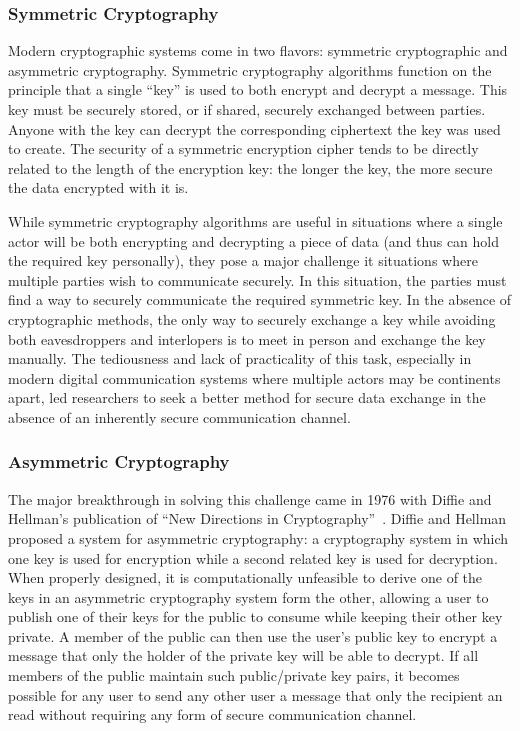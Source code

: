\subsubsection{Symmetric Cryptography}

Modern cryptographic systems come in two flavors: symmetric
cryptographic and asymmetric cryptography. Symmetric cryptography
algorithms function on the principle that a single ``key'' is used to
both encrypt and decrypt a message. This key must be securely stored,
or if shared, securely exchanged between parties. Anyone with the key
can decrypt the corresponding ciphertext the key was used to
create. The security of a symmetric encryption cipher tends to be
directly related to the length of the encryption key: the longer the
key, the more secure the data encrypted with it is.

While symmetric cryptography algorithms are useful in situations where
a single actor will be both encrypting and decrypting a piece of data
(and thus can hold the required key personally), they pose a major
challenge it situations where multiple parties wish to communicate
securely. In this situation, the parties must find a way to securely
communicate the required symmetric key. In the absence of
cryptographic methods, the only way to securely exchange a key while
avoiding both eavesdroppers and interlopers is to meet in person and
exchange the key manually. The tediousness and lack of practicality of
this task, especially in modern digital communication systems where
multiple actors may be continents apart, led researchers to seek a
better method for secure data exchange in the absence of an inherently
secure communication channel.

\subsubsection{Asymmetric Cryptography}

The major breakthrough in solving this challenge came in 1976 with
Diffie and Hellman's publication of ``New Directions in
Cryptography''~\cite{Diffie1976}. Diffie and Hellman proposed a system
for asymmetric cryptography: a cryptography system in which one key is
used for encryption while a second related key is used for
decryption. When properly designed, it is computationally unfeasible
to derive one of the keys in an asymmetric cryptography system form
the other, allowing a user to publish one of their keys for the public
to consume while keeping their other key private. A member of the
public can then use the user's public key to encrypt a message that
only the holder of the private key will be able to decrypt. If all
members of the public maintain such public/private key pairs, it
becomes possible for any user to send any other user a message that
only the recipient an read without requiring any form of secure
communication channel.

